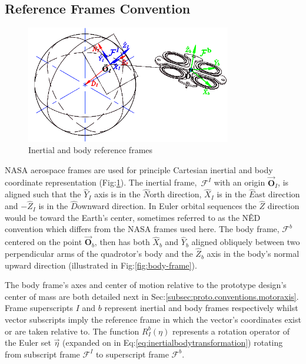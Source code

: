 \subsection{Reference Frames Convention}
\label{subsec:proto.conventions.frames}
\begin{figure}[htbp]
\centering
\includegraphics[width=0.8\textwidth]{figs/reference-frame}
\caption{Inertial and body reference frames}
\label{fig:ref_frame}
\end{figure}
NASA aerospace frames are used for principle Cartesian inertial and body coordinate representation (Fig:\ref{fig:ref_frame}). The inertial frame,~$\mathcal{F}^I$ with an origin $\vec{\mathbf{O}}_I$, is aligned such that the $\hat{Y}_I$ axis is in the $\hat{N}$orth direction, $\hat{X}_I$ is in the $\hat{E}$ast direction and $-\hat{Z}_I$ is  in the $\hat{D}$ownward direction. In Euler orbital sequences the $\hat{Z}$ direction would be toward the Earth's center, sometimes referred to as the N\^{E}D convention which differs from the NASA frames used here. The body frame, $\mathcal{F}^b$ centered on the point $\vec{\mathbf{O}}_b$, then has both $\hat{X}_b$ and $\hat{Y}_b$ aligned obliquely between two perpendicular arms of the quadrotor's body and the $\hat{Z}_b$ axis in the body's normal upward direction (illustrated in Fig:\ref{fig:body-frame}). 
\par
The body frame's axes and center of motion relative to the prototype design's center of mass are both detailed next in Sec:\ref{subsec:proto.conventions.motoraxis}. Frame superscripts $I$ and $b$ represent inertial and body frames respectively whilst vector subscripts imply the reference frame in which the vector's coordinates exist or are taken relative to. The function $R_I^b(\eta)$ represents a rotation operator of the Euler set $\vec{\eta}$ (expanded on in Eq:\ref{eq:inertialbodytransformation}) rotating from subscript frame $\mathcal{F}^I$ to superscript frame $\mathcal{F}^b$. 
